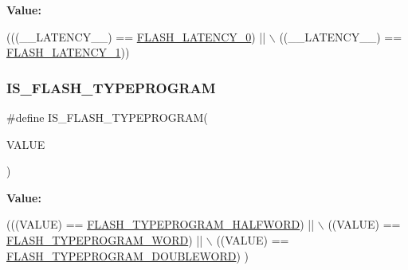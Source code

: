 {\bfseries Value\+:}
\begin{DoxyCode}
(((\_\_LATENCY\_\_) == \hyperlink{group___f_l_a_s_h___latency_ga1276f51e97dc9857ca261fae4eb890f3}{FLASH\_LATENCY\_0}) || \(\backslash\)
                                       ((\_\_LATENCY\_\_) == \hyperlink{group___f_l_a_s_h___latency_ga28c611f2cb4a3772ab37c538357fd5f6}{FLASH\_LATENCY\_1}))
\end{DoxyCode}
\mbox{\label{group___f_l_a_s_h___private___macros_gaa189973d36fcbbaf7f758c682247ad39}} 
\subsubsection{\texorpdfstring{I\+S\+\_\+\+F\+L\+A\+S\+H\+\_\+\+T\+Y\+P\+E\+P\+R\+O\+G\+R\+AM}{IS\_FLASH\_TYPEPROGRAM}}
{\footnotesize\ttfamily \#define I\+S\+\_\+\+F\+L\+A\+S\+H\+\_\+\+T\+Y\+P\+E\+P\+R\+O\+G\+R\+AM(\begin{DoxyParamCaption}\item[{}]{V\+A\+L\+UE }\end{DoxyParamCaption})}

{\bfseries Value\+:}
\begin{DoxyCode}
(((VALUE) == \hyperlink{group___f_l_a_s_h___type___program_ga2b607dfc2efd463a8530e327bc755582}{FLASH\_TYPEPROGRAM\_HALFWORD}) || \(\backslash\)
                                      ((VALUE) == \hyperlink{group___f_l_a_s_h___type___program_gadd25c6821539030ba6711e7c0d586c3e}{FLASH\_TYPEPROGRAM\_WORD})     || \(\backslash\)
                                      ((VALUE) == \hyperlink{group___f_l_a_s_h___type___program_gabdc2b0b4d2e66c2be90fafbfbf1e225f}{FLASH\_TYPEPROGRAM\_DOUBLEWORD})
      )
\end{DoxyCode}
